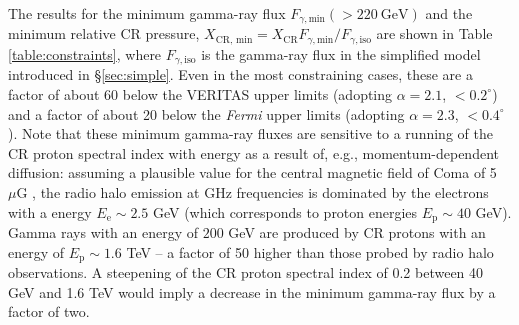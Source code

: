 \documentclass[12pt,manuscript]{aastex}
\def\Fermi{{\em Fermi}\xspace}
\newcommand{\rmn}{\mathrm}
\newcommand{\CR}{\mathrm{CR}}
\begin{document}
The results for the minimum gamma-ray flux $F_{\gamma,\rmn{min}}(>220~\rmn{GeV})$ and the minimum
relative CR pressure, $X_{\CR,\,\rmn{min}} = X_\CR F_{\gamma,\rmn{min}}/F_{\gamma,\rmn{iso}}$ are
shown in Table \ref{table:constraints}, where $F_{\gamma,\rmn{iso}}$ is the gamma-ray flux in the
simplified model introduced in \S\ref{sec:simple}. Even in the most constraining cases, these are a
factor of about 60 below the VERITAS upper limits (adopting $\alpha=2.1$, $<0.2^{\circ}$) and a
factor of about 20 below the \Fermi upper limits (adopting $\alpha=2.3$, $<0.4^{\circ}$). Note
that these minimum gamma-ray fluxes are sensitive to a running of the CR proton spectral index with
energy as a result of, e.g., momentum-dependent diffusion: assuming a plausible value for the
central magnetic field of Coma of 5~$\mu$G \citep{article:Bonafede_etal:2010}, the radio halo
emission at GHz frequencies is dominated by the electrons with a energy $E_\rmn{e} \sim 2.5$ GeV
(which corresponds to proton energies $E_\rmn{p} \sim 40$ GeV). Gamma rays with an energy of $200$
GeV are produced by CR protons with an energy of $E_\rmn{p} \sim 1.6$ TeV -- a factor of 50 higher
than those probed by radio halo observations. A steepening of the CR proton spectral index of 0.2
between 40 GeV and 1.6 TeV would imply a decrease in the minimum gamma-ray flux by a factor of two.

%
%
 
\end{document}

